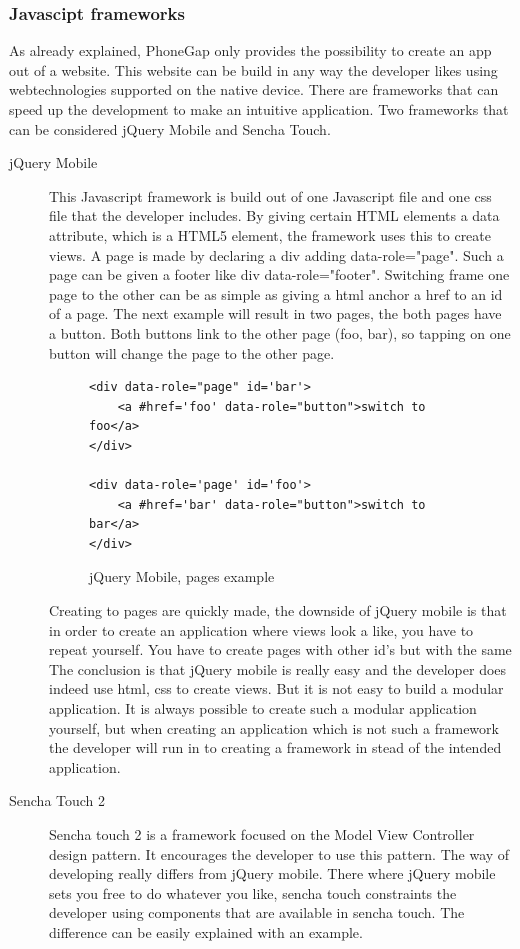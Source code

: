 \documentclass[10pt,a4paper]{article}
\begin{document}
\subsubsection*{Javascipt frameworks}
As already explained, PhoneGap only provides the possibility to create an app out of a website. This website can be build in any way the developer likes using webtechnologies supported on the native device. There are frameworks that can speed up the development to make an intuitive application. Two frameworks that can be considered jQuery Mobile and Sencha Touch. 
\begin{description}
\item [jQuery Mobile]
This Javascript framework is build out of one Javascript file and one css file that the developer includes. By giving certain HTML elements a data attribute, which is a HTML5 element, the framework uses this to create views. A page is made by declaring a div adding data-role="page". Such a page can be given a footer like div data-role="footer". 
Switching frame one page to the other can be as simple as giving a html anchor a href to an id of a page. The next example will result in two pages, the both pages have a button. Both buttons link to the other page (foo, bar), so tapping on one button will change the page to the other page.
\begin{figure}
\begin{lstlisting}
<div data-role="page" id='bar'>
	<a #href='foo' data-role="button">switch to foo</a>
</div>

<div data-role='page' id='foo'>
	<a #href='bar' data-role="button">switch to bar</a>
</div>
\end{lstlisting}
\caption{jQuery Mobile, pages example}
\end{figure}

Creating to pages are quickly made, the downside of jQuery mobile is that in order to create an application where views look a like, you have to repeat yourself. You have to create pages with other id's but with the same  The conclusion is that jQuery mobile is really easy and the developer does indeed use html, css to create views.  But it is not easy to build a modular application. It is always possible to create such a modular application yourself, but when creating an application which is not such a framework the developer will run in to creating a framework in stead of the intended application.

\item [Sencha Touch 2]
Sencha touch 2 is a framework focused on the Model View Controller design pattern. It encourages the developer to use this pattern. The way of developing really differs from jQuery mobile. There where jQuery mobile sets you free to do whatever you like, sencha touch constraints the developer using components that are available in sencha touch. The difference can be easily explained with an example.


\end{description}
\end{document}
